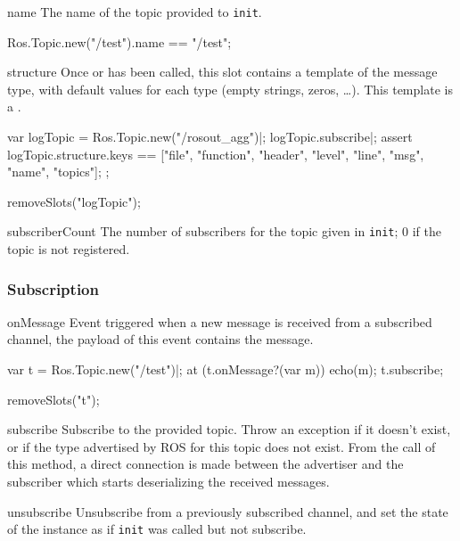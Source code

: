 \begin{urbiscriptapi}
\item[name]%
  The name of the topic provided to \lstinline{init}.
\begin{urbiassert}
Ros.Topic.new("/test").name == "/test";
\end{urbiassert}


\item[structure]%
  Once  or  has been called, this slot
  contains a template of the message type, with default values for each type
  (empty strings, zeros, \ldots).  This template is a
  .
\begin{urbiscript}
var logTopic = Ros.Topic.new("/rosout_agg")|;
logTopic.subscribe|;
assert
{
  logTopic.structure.keys
    == ["file", "function", "header", "level", "line", "msg", "name", "topics"];
};
\end{urbiscript}
\begin{urbicomment}
removeSlots("logTopic");
\end{urbicomment}


\item[subscriberCount]%
  The number of subscribers for the topic given in \lstinline{init}; 0 if
  the topic is not registered.
\end{urbiscriptapi}


\subsubsection{Subscription}

\begin{urbiscriptapi}
\item[onMessage]%
  Event triggered when a new message is received from a subscribed channel,
  the payload of this event contains the message.

\begin{urbiunchecked}
var t = Ros.Topic.new("/test")|;
at (t.onMessage?(var m))
  echo(m);
t.subscribe;
\end{urbiunchecked}
\begin{urbicomment}
removeSlots("t");
\end{urbicomment}


\item[subscribe]%
  Subscribe to the provided topic. Throw an exception if it doesn't exist, or
  if the type advertised by ROS for this topic does not exist.  From the
  call of this method, a direct connection is made between the advertiser
  and the subscriber which starts deserializing the received messages.


\item[unsubscribe]%
  Unsubscribe from a previously subscribed channel, and set the state of the
  instance as if \lstinline{init} was called but not subscribe.
\end{urbiscriptapi}


